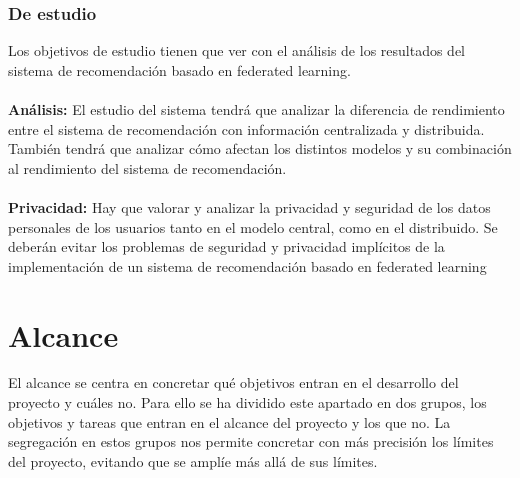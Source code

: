 \subsubsection{De estudio}
Los objetivos de estudio tienen que ver con el análisis de los resultados del sistema de recomendación basado en federated learning.
\\ \\
\textbf{Análisis: }
El estudio del sistema tendrá que analizar la diferencia de rendimiento entre el sistema de recomendación con información centralizada y distribuida. También tendrá que analizar cómo afectan los distintos modelos y su combinación al rendimiento del sistema de recomendación.
\\ \\
\textbf{Privacidad: }
Hay que valorar y analizar la privacidad y seguridad de los datos personales de los usuarios tanto en el modelo central, como en el distribuido. Se deberán evitar los problemas de seguridad y privacidad implícitos de la implementación de un sistema de recomendación basado en federated learning

\section{Alcance}
El alcance se centra en concretar qué objetivos entran en el desarrollo del proyecto y cuáles no. Para ello se ha dividido este apartado en dos grupos, los objetivos y tareas que entran en el alcance del proyecto y los que no. La segregación en estos grupos nos permite concretar con más precisión los límites del proyecto, evitando que se amplíe más allá de sus límites. 

